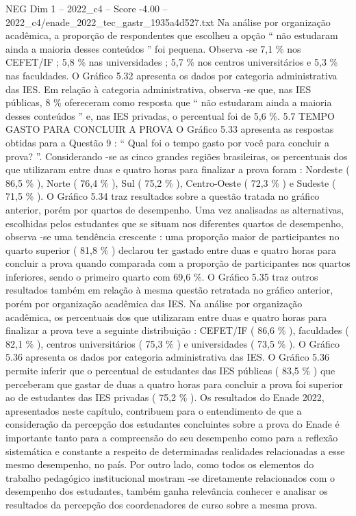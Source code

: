 \begin{textsample}{NEG Dim 1 – 2022\_c4 – Score -4.00 – 2022\_c4/enade\_2022\_tec\_gastr\_1935a4d527.txt}
Na análise por organização acadêmica, a proporção de respondentes que escolheu a opção “ não estudaram ainda a maioria desses conteúdos ” foi pequena.
Observa -se 7,1 \% nos CEFET/IF ; 5,8 \% nas universidades ; 5,7 \% nos centros universitários e 5,3 \% nas faculdades.
O Gráfico 5.32 apresenta os dados por categoria administrativa das IES.
Em relação à categoria administrativa, observa -se que, nas IES públicas, 8 \% ofereceram como resposta que “ não estudaram ainda a maioria desses conteúdos ” e, nas IES privadas, o percentual foi de 5,6 \%. 5.7 TEMPO GASTO PARA CONCLUIR A PROVA O Gráfico 5.33 apresenta as respostas obtidas para a Questão 9 : “ Qual foi o tempo gasto por você para concluir a prova? ”.
Considerando -se as cinco grandes regiões brasileiras, os percentuais dos que utilizaram entre duas e quatro horas para finalizar a prova foram : Nordeste ( 86,5 \% ), Norte ( 76,4 \% ), Sul ( 75,2 \% ), Centro-Oeste ( 72,3 \% ) e Sudeste ( 71,5 \% ).
O Gráfico 5.34 traz resultados sobre a questão tratada no gráfico anterior, porém por quartos de desempenho.
Uma vez analisadas as alternativas, escolhidas pelos estudantes que se situam nos diferentes quartos de desempenho, observa -se uma tendência crescente : uma proporção maior de participantes no quarto superior ( 81,8 \% ) declarou ter gastado entre duas e quatro horas para concluir a prova quando comparada com a proporção de participantes nos quartos inferiores, sendo o primeiro quarto com 69,6 \%.
O Gráfico 5.35 traz outros resultados também em relação à mesma questão retratada no gráfico anterior, porém por organização acadêmica das IES.
Na análise por organização acadêmica, os percentuais dos que utilizaram entre duas e quatro horas para finalizar a prova teve a seguinte distribuição : CEFET/IF ( 86,6 \% ), faculdades ( 82,1 \% ), centros universitários ( 75,3 \% ) e universidades ( 73,5 \% ).
O Gráfico 5.36 apresenta os dados por categoria administrativa das IES.
O Gráfico 5.36 permite inferir que o percentual de estudantes das IES públicas ( 83,5 \% ) que perceberam que gastar de duas a quatro horas para concluir a prova foi superior ao de estudantes das IES privadas ( 75,2 \% ).
Os resultados do Enade 2022, apresentados neste capítulo, contribuem para o entendimento de que a consideração da percepção dos estudantes concluintes sobre a prova do Enade é importante tanto para a compreensão do seu desempenho como para a reflexão sistemática e constante a respeito de determinadas realidades relacionadas a esse mesmo desempenho, no país.
Por outro lado, como todos os elementos do trabalho pedagógico institucional mostram -se diretamente relacionados com o desempenho dos estudantes, também ganha relevância conhecer e analisar os resultados da percepção dos coordenadores de curso sobre a mesma prova.

\end{textsample}
